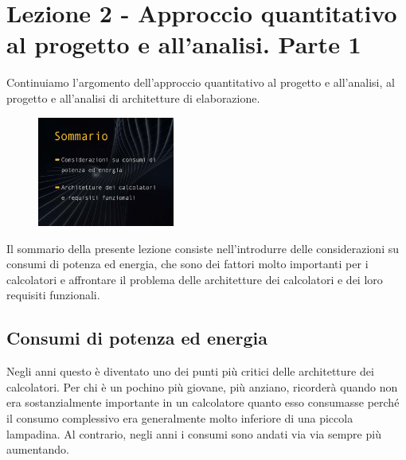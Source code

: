 \chapter{Lezione 2 - Approccio quantitativo al progetto e all'analisi. Parte 1}

Continuiamo l'argomento dell'approccio quantitativo al progetto e all'analisi, al progetto e all'analisi di architetture di elaborazione.

\begin{figure}[h]
  \centering
  \includegraphics[width=0.40\textwidth,
                    trim=40 80 10 40, %
                    clip]
                    {images/Lez02_p01_fig_02.png}
\end{figure}
Il sommario della presente lezione consiste nell'introdurre delle considerazioni su consumi di potenza ed energia, che sono dei fattori molto importanti per i calcolatori e affrontare il problema delle architetture dei calcolatori e dei loro requisiti funzionali.

\section{Consumi di potenza ed energia}

Negli anni questo è diventato uno dei punti più critici delle architetture dei calcolatori.
Per chi è un pochino più giovane, più anziano, ricorderà quando non era sostanzialmente importante in un calcolatore quanto esso consumasse perché il consumo complessivo era generalmente molto inferiore di una piccola lampadina.
Al contrario, negli anni i consumi sono andati via via sempre più aumentando.

